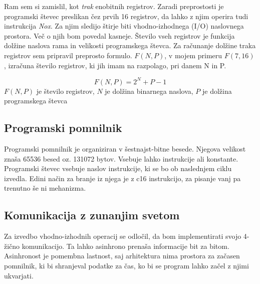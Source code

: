 \documentclass[12pt]{article}
\begin{document}
Ram sem si zamislil, kot \textit{trak} enobitnih registrov.
Zaradi preprostosti je programski števec preslikan čez prvih 16 registrov, da lahko z njim operira tudi instrukcija \textit{Nox}.
Za njim sledijo štirje biti vhodno-izhodnega (I/O) naslovnega prostora.
Več o njih bom povedal kasneje.
Število vseh registrov je funkcija dolžine naslova rama in velikosti programskega števca.
Za računanje dolžine traka registrov sem pripravil preprosto formulo.
$F(N,P)$, v mojem primeru $F(7,16)$, izračuna število registrov, ki jih imam na razpolago, pri danem N in P.
\begin{center}
  \begin{displaymath}
    F(N,P)=2^{N}+P-1
  \end{displaymath}
  $F(N,P)$ je število registrov, $N$ je dolžina binarnega naslova, $P$ je dolžina programskega števca
\end{center}

\subsection{Programski pomnilnik}
Programski pomnilnik je organiziran v šestnajst-bitne besede.
Njegova velikost znaša 65536 besed oz. 131072 bytov.
Vsebuje lahko instrukcije ali konstante.
Programski števec vsebuje naslov instrukcije, ki se bo ob naslednjem ciklu izvedla.
Edini način za branje iz njega je z c16 instrukcijo, za pisanje vanj pa trenutno še ni mehanizma.


\subsection{Komunikacija z zunanjim svetom}
Za izvedbo vhodno-izhodnih operacij se odločil, da bom implementirati svojo 4-žično komunikacijo.
Ta lahko asinhrono prenaša informacije bit za bitom.
Asinhronost je pomembna lastnost, saj arhitektura nima prostora za začasen pomnilnik, ki bi shranjeval podatke za čas, ko bi se program lahko začel z njimi ukvarjati.
\end{document}

